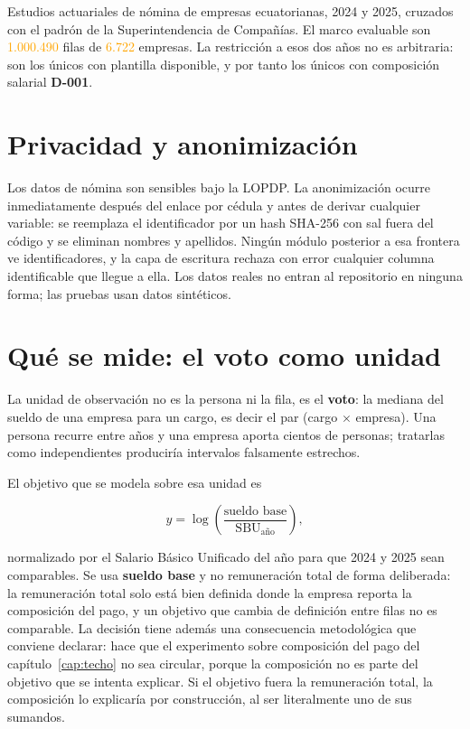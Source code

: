 \documentclass[12pt,a4paper,oneside]{report}
\newcommand{\verificar}[1]{\textcolor{orange}{#1}}
\newcommand{\dref}[1]{\textbf{D-#1}}
\begin{document}
Estudios actuariales de nómina de empresas ecuatorianas, 2024 y 2025, cruzados con el
padrón de la Superintendencia de Compañías. El marco evaluable son \verificar{1.000.490}
filas de \verificar{6.722} empresas.
La restricción a esos dos años no es arbitraria: son los únicos con plantilla disponible,
y por tanto los únicos con composición salarial \dref{001}.

\section{Privacidad y anonimización}

Los datos de nómina son sensibles bajo la LOPDP. La anonimización ocurre inmediatamente
después del enlace por cédula y antes de derivar cualquier variable: se reemplaza el
identificador por un hash SHA-256 con sal fuera del código y se eliminan nombres y
apellidos. Ningún módulo posterior a esa frontera ve identificadores, y la capa de
escritura rechaza con error cualquier columna identificable que llegue a ella. Los datos
reales no entran al repositorio en ninguna forma; las pruebas usan datos sintéticos.

\section{Qué se mide: el voto como unidad}

La unidad de observación no es la persona ni la fila, es el \textbf{voto}: la mediana del
sueldo de una empresa para un cargo, es decir el par (cargo $\times$ empresa). Una persona
recurre entre años y una empresa aporta cientos de personas; tratarlas como independientes
produciría intervalos falsamente estrechos.

El objetivo que se modela sobre esa unidad es

\begin{equation}
y = \log\!\left(\frac{\text{sueldo base}}{\text{SBU}_{\text{año}}}\right),
\label{eq:objetivo}
\end{equation}

normalizado por el Salario Básico Unificado del año para que 2024 y 2025 sean comparables.
Se usa \textbf{sueldo base} y no remuneración total de forma deliberada: la remuneración
total solo está bien definida donde la empresa reporta la composición del pago, y un
objetivo que cambia de definición entre filas no es comparable. La decisión tiene además
una consecuencia metodológica que conviene declarar: hace que el experimento sobre
composición del pago del capítulo~\ref{cap:techo} no sea circular, porque la composición
no es parte del objetivo que se intenta explicar. Si el objetivo fuera la remuneración
total, la composición lo explicaría por construcción, al ser literalmente uno de sus
sumandos.
\end{document}
